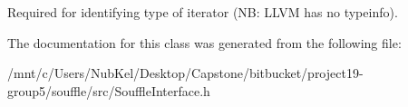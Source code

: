Required for identifying type of iterator (NB\+: L\+L\+VM has no typeinfo). 

The documentation for this class was generated from the following file\+:\begin{DoxyCompactItemize}
\item 
/mnt/c/\+Users/\+Nub\+Kel/\+Desktop/\+Capstone/bitbucket/project19-\/group5/souffle/src/Souffle\+Interface.\+h\end{DoxyCompactItemize}
